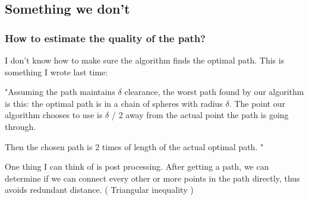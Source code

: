 \documentclass{article}
\begin{document}
  \subsection{Something we don't}
    \subsubsection{How to estimate the quality of the path?}
      I don't know how to make sure the algorithm finds the optimal path. This is something I wrote last time:

        "Assuming the path maintains $\delta$ clearance, the worst path found by our algorithm is this: the optimal path is in a chain of spheres with radius $\delta$. The point our algorithm chooses to use is $\delta$ / 2 away from the actual point the path is going through.

        Then the chosen path is 2 times of length of the actual optimal path. "

      One thing I can think of is post processing. After getting a path, we can determine if we can connect every other or more points in the path directly, thus avoids redundant distance. ( Triangular inequality ) 
\end{document}

